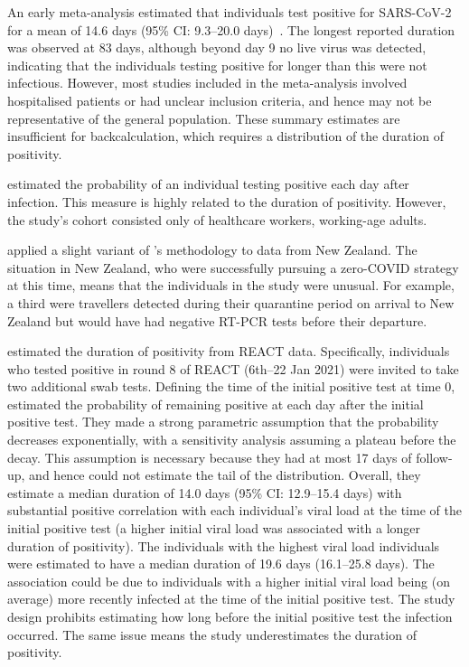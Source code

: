 \documentclass[thesis.tex]{subfiles}
\begin{document}
An early meta-analysis estimated that individuals test positive for SARS-CoV-2 for a mean of 14.6 days (95\% CI: 9.3--20.0 days)~\autocite{cevikShedding}.
The longest reported duration was observed at 83 days, although beyond day 9 no live virus was detected, indicating that the individuals testing positive for longer than this were not infectious.
However, most studies included in the meta-analysis involved hospitalised patients or had unclear inclusion criteria, and hence may not be representative of the general population.
These summary estimates are insufficient for backcalculation, which requires a distribution of the duration of positivity.

\Textcite{hellewellPCRSensitivity} estimated the probability of an individual testing positive each day after infection.
This measure is highly related to the duration of positivity.
However, the study's cohort consisted only of healthcare workers, \ie working-age adults.

\Textcite{binnySensitivity} applied a slight variant of \textcite{hellewellPCRSensitivity}'s methodology to data from New Zealand.
The situation in New Zealand, who were successfully pursuing a zero-COVID strategy at this time, means that the individuals in the study were unusual.
For example, a third were travellers detected during their quarantine period on arrival to New Zealand but would have had negative RT-PCR tests before their departure.

\Textcite{ealesCharacterising} estimated the duration of positivity from REACT data.
Specifically, individuals who tested positive in round 8 of REACT (6th--22 Jan 2021) were invited to take two additional swab tests.
Defining the time of the initial positive test at time 0, \textcite{ealesCharacterising} estimated the probability of remaining positive at each day after the initial positive test.
They made a strong parametric assumption that the probability decreases exponentially, with a sensitivity analysis assuming a plateau before the decay.
This assumption is necessary because they had at most 17 days of follow-up, and hence could not estimate the tail of the distribution.
Overall, they estimate a median duration of 14.0 days (95\% CI: 12.9--15.4 days) with substantial positive correlation with each individual’s viral load at the time of the initial positive test (\ie a higher initial viral load was associated with a longer duration of positivity).
The individuals with the highest viral load individuals were estimated to have a median duration of 19.6 days (16.1--25.8 days).
The association could be due to individuals with a higher initial viral load being (on average) more recently infected at the time of the initial positive test.
The study design prohibits estimating how long before the initial positive test the infection occurred.
The same issue means the study underestimates the duration of positivity.
\end{document}
